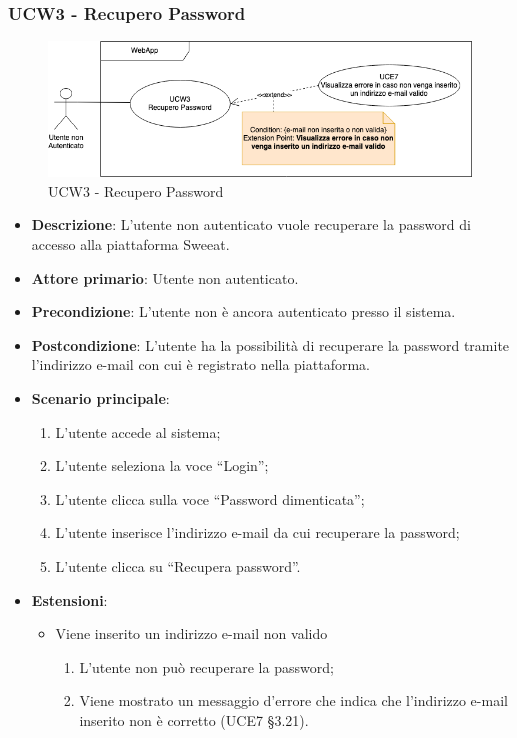 \subsubsection{UCW3 - Recupero Password}
\begin{figure}[!h]
\centering
\includegraphics[scale=0.5]{UC_images/UCW3.png}
\caption{UCW3 - Recupero Password}
\end{figure}
\begin{itemize}
\item \textbf{Descrizione}: L'utente non autenticato vuole recuperare la password di accesso alla piattaforma Sweeat.
\item \textbf{Attore primario}: Utente non autenticato.
\item \textbf{Precondizione}: L’utente non è ancora autenticato presso il sistema.
\item \textbf{Postcondizione}: L’utente ha la possibilità di recuperare la password tramite l'indirizzo e-mail con cui è registrato nella piattaforma.

\item \textbf{Scenario principale}:
\begin{enumerate}
\item L’utente accede al sistema;
\item L’utente seleziona la voce “Login”;
\item L’utente clicca sulla voce “Password dimenticata”;
\item L’utente inserisce l’indirizzo e-mail da cui recuperare la password;
\item L’utente clicca su “Recupera password”. 
\end{enumerate}

\item \textbf{Estensioni}:
\begin{itemize}
\item Viene inserito un indirizzo e-mail non valido 
\begin{enumerate}
	\item L’utente non può recuperare la password;
	\item Viene mostrato un messaggio d’errore che indica che l’indirizzo e-mail inserito non è corretto (UCE7 §3.21).
\end{enumerate}
\end{itemize}
\end{itemize}

\pagebreak